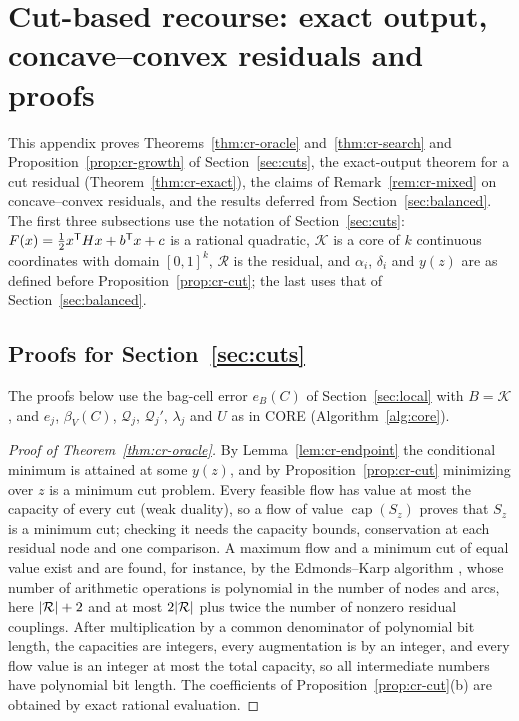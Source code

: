 \section{Cut-based recourse: exact output, concave--convex residuals and proofs}\label{app:recourse-cuts}

This appendix proves Theorems~\ref{thm:cr-oracle} and~\ref{thm:cr-search}
and Proposition~\ref{prop:cr-growth} of Section~\ref{sec:cuts}, the
exact-output theorem for a cut residual (Theorem~\ref{thm:cr-exact}), the
claims of Remark~\ref{rem:cr-mixed} on concave--convex residuals, and the
results deferred from Section~\ref{sec:balanced}. The first three
subsections use the notation of Section~\ref{sec:cuts}:
$F(x)=\frac12x^{\mathsf T}Hx+b^{\mathsf T}x+c$ is a rational quadratic, $\mathcal K$ is a
core of $k$ continuous coordinates with domain $[0,1]^k$, $\mathcal R$ is the
residual, and $\alpha_i$, $\delta_i$ and $y(z)$ are as defined before
Proposition~\ref{prop:cr-cut}; the last uses that of
Section~\ref{sec:balanced}.

\subsection{Proofs for Section~\ref{sec:cuts}}\label{app:cr-proofs}

The proofs below use the bag-cell error $e_B(C)$ of Section~\ref{sec:local}
with $B=\mathcal K$, and $e_j$, $\beta_V(C)$, $\mathcal Q_j$,
$\mathcal Q_j'$, $\lambda_j$ and $U$ as in CORE (Algorithm~\ref{alg:core}).

\begin{proof}[Proof of Theorem~\ref{thm:cr-oracle}]
By Lemma~\ref{lem:cr-endpoint} the conditional minimum is attained at some
$y(z)$, and by Proposition~\ref{prop:cr-cut} minimizing over $z$ is a
minimum cut problem. Every feasible flow has value at most the capacity of
every cut (weak duality), so a flow of value $\operatorname{cap}(S_z)$
proves that $S_z$ is a minimum cut; checking it needs the capacity bounds,
conservation at each residual node and one comparison. A maximum flow and a
minimum cut of equal value exist and are found, for instance, by the
Edmonds--Karp algorithm \cite{EdmondsKarp1972}, whose number of arithmetic
operations is polynomial in the number of nodes and arcs, here
$\lvert \mathcal R\rvert+2$ and at most $2\lvert \mathcal R\rvert$ plus twice the number
of nonzero residual couplings. After multiplication by a common denominator
of polynomial bit length, the capacities are integers, every augmentation is
by an integer, and every flow value is an integer at most the total
capacity, so all intermediate numbers have polynomial bit length. The
coefficients of Proposition~\ref{prop:cr-cut}(b) are obtained by exact
rational evaluation.
\end{proof}

